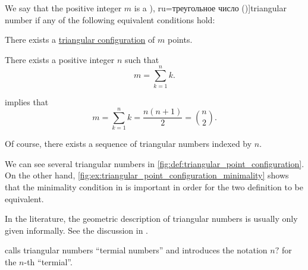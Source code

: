 \begin{definition}\label{def:triangular_number}
  We say that the positive integer \( m \) is a \term[en=triangular number (\cite[1]{Deza2012FigurateNumbers}), ru=треугольное число (\cite[14]{АлександровМаркушевичХинчинИПр1963ЭнциклопедияТом4})]{triangular number} if any of the following equivalent conditions hold:
  \begin{thmenum}
     There exists a \hyperref[def:triangular_point_configuration]{triangular configuration} of \( m \) points.

     There exists a positive integer \( n \) such that
    \begin{equation}\label{eq:def:triangular_number/arithmetic}
      m = \sum_{k=1}^n k.
    \end{equation}
  \end{thmenum}
\end{definition}
\begin{comments}
  \item {} implies that
  \begin{equation*}
    m = \sum_{k=1}^n k = \frac {n(n + 1)} 2 = \binom n 2.
  \end{equation*}

  \item Of course, there exists a sequence of triangular numbers indexed by \( n \).

  \item We can see several triangular numbers in \cref{fig:def:triangular_point_configuration}. On the other hand, \cref{fig:ex:triangular_point_configuration_minimality} shows that the minimality condition in  is important in order for the two definition to be equivalent.

  \item In the literature, the geometric description of triangular numbers is usually only given informally. See the discussion in .

  \item {} calls triangular numbers \enquote{termial numbers} and introduces the notation \( n? \) for the \( n \)-th \enquote{termial}.
\end{comments}
